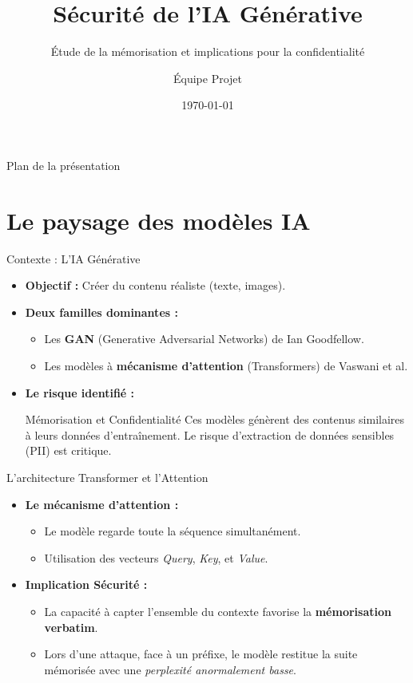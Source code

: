 \documentclass[aspectratio=169, 10pt]{beamer}
\title{Sécurité de l'IA Générative}
\subtitle{Étude de la mémorisation et implications pour la confidentialité}
\author{Équipe Projet}
\institute{Télécom SudParis}
\date{\today}
\begin{document}
\begin{frame}
    \titlepage
\end{frame}

\begin{frame}{Plan de la présentation}
    \tableofcontents
\end{frame}

\section{Le paysage des modèles IA}

\begin{frame}{Contexte : L'IA Générative}
    \begin{itemize}
        \item \textbf{Objectif :} Créer du contenu réaliste (texte, images).
        \item \textbf{Deux familles dominantes :}
        \begin{itemize}
            \item Les \textbf{GAN} (Generative Adversarial Networks) de Ian Goodfellow.
            \item Les modèles à \textbf{mécanisme d'attention} (Transformers) de Vaswani et al.
        \end{itemize}
        \item \textbf{Le risque identifié :} 
        \begin{alertblock}{Mémorisation et Confidentialité}
        Ces modèles génèrent des contenus similaires à leurs données d'entraînement. Le risque d'extraction de données sensibles (PII) est critique.
        \end{alertblock}
    \end{itemize}
\end{frame}

\begin{frame}{L'architecture Transformer et l'Attention}
    \begin{itemize}
        \item \textbf{Le mécanisme d'attention :} 
        \begin{itemize}
            \item Le modèle regarde toute la séquence simultanément.
            \item Utilisation des vecteurs \textit{Query}, \textit{Key}, et \textit{Value}.
        \end{itemize}
        \item \textbf{Implication Sécurité :}
        \begin{itemize}
            \item La capacité à capter l'ensemble du contexte favorise la \textbf{mémorisation verbatim}.
            \item Lors d'une attaque, face à un préfixe, le modèle restitue la suite mémorisée avec une \textit{perplexité anormalement basse}.
        \end{itemize}
    \end{itemize}
\end{frame}
\end{document}

